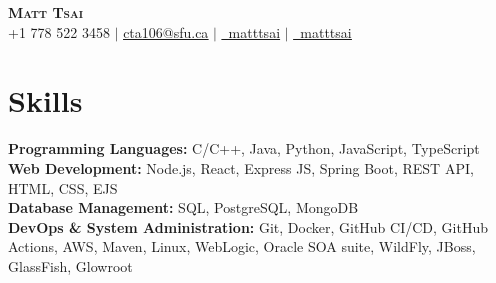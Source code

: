 \renewcommand\labelitemii{$\vcenter{\hbox{\tiny$\bullet$}}$}

\newcommand{\resumeSubHeadingListStart}{\begin{itemize}[leftmargin=0.15in, label={}]}
\newcommand{\resumeSubHeadingListEnd}{\end{itemize}}
\newcommand{\resumeItemListStart}{\begin{itemize}}
\newcommand{\resumeItemListEnd}{\end{itemize}\vspace{-5pt}}






\begin{center}
    \textbf{\Huge \scshape Matt Tsai} \\ \vspace{1pt}
    \small +1 778 522 3458 $|$ \href{mailto:cta106@sfu.ca}{\underline{cta106@sfu.ca}} $|$ 
    \href{https://www.linkedin.com/in/matt-tsai-90a3291a3/}{\underline{\faLinkedinSquare\ matttsai}} $|$ 
    \href{https://github.com/asd881018}{\underline{\faGithub\ matttsai}}
    
\end{center}

\section{Skills}
 \begin{itemize}[leftmargin=0.15in, label={}]
    \small{\item{
     \textbf{Programming Languages:} C/C++, Java, Python, JavaScript, TypeScript\\
    \textbf{Web Development:} Node.js, React, Express JS, Spring Boot, REST API, HTML, CSS, EJS \\
    \textbf{Database Management:} SQL, PostgreSQL, MongoDB \\
    \textbf{DevOps \& System Administration:} Git, Docker, GitHub CI/CD, GitHub Actions, AWS, Maven, Linux, WebLogic, Oracle SOA suite, WildFly, JBoss, GlassFish, Glowroot\\
    }}
    
 \end{itemize}




